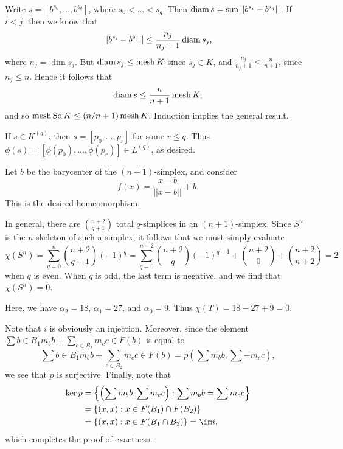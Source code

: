 \documentclass[../../solutions.tex]{subfiles}
\begin{document}
\begin{exercise} \leavevmode
Write $s=[b^{s_0},\dots,b^{s_q}]$, where $s_0<\dots<s_q$.
Then $\operatorname{diam} s=\sup||b^{s_i}-b^{s_j}||$.
If $i<j$, then we know that
\[||b^{s_i}-b^{s_j}||\le\frac{n_j}{n_j+1}\operatorname{diam} s_j,\]
where $n_j=\dim s_j$.
But $\operatorname{diam} s_j\le\operatorname{mesh} K$ since $s_j\in K$, and $\frac{n_j}{n_j+1}\le\frac{n}{n+1}$, since $n_j\le n$.
Hence it follows that
\[\operatorname{diam} s\le\frac n{n+1}\operatorname{mesh} K,\]
and so $\operatorname{mesh}\operatorname{Sd} K\le(n/n+1)\operatorname{mesh} K$.
Induction implies the general result.
\end{exercise}

\begin{exercise} \leavevmode
If $s\in K^{(q)}$, then $s=[p_0,\dots,p_r]$ for some $r\le q$.
Thus $\phi(s)=[\phi(p_0),\dots,\phi(p_r)]\in L^{(q)}$, as desired.
\end{exercise}

\begin{exercise} \leavevmode
Let $b$ be the barycenter of the $(n+1)$-simplex, and consider
\[f(x)=\frac{x-b}{||x-b||}+b.\]
This is the desired homeomorphism.
\end{exercise}

\begin{exercise} \leavevmode
In general, there are $\binom{n+2}{q+1}$ total $q$-simplices in an $(n+1)$-simplex.
Since $S^n$ is the $n$-skeleton of such a simplex, it follows that we must simply evaluate
\[\chi(S^n)=\sum_{q=0}^n\binom{n+2}{q+1}(-1)^q=\sum_{q=0}^{n+2}\binom{n+2}q(-1)^{q+1}+\binom{n+2}0+\binom{n+2}{n+2}=2\]
when $q$ is even.
When $q$ is odd, the last term is negative, and we find that $\chi(S^n)=0$.
\end{exercise}

\begin{exercise} \leavevmode
Here, we have $\alpha_2=18$, $\alpha_1=27$, and $\alpha_0=9$.
Thus $\chi(T)=18-27+9=0$.
\end{exercise}

\begin{exercise} \leavevmode
Note that $i$ is obviously an injection.
Moreover, since the element $\sum{b\in B_1}m_bb+\sum_{c\in B_2}m_cc\in F(b)$ is equal to
\[\sum{b\in B_1}m_bb+\sum_{c\in B_2}m_cc\in F(b)=p\left(\sum m_bb,\sum-m_cc\right),\]
we see that $p$ is surjective.
Finally, note that
\begin{align*}
\ker p&=\left\{\left(\sum m_bb,\sum m_cc\right):\sum m_bb=\sum m_cc\right\}\\
&=\{(x,x):x\in F(B_1)\cap F(B_2)\}\\
&=\{(x,x):x\in F(B_1\cap B_2)\}=\im i,
\end{align*}
which completes the proof of exactness.
\end{exercise}
\end{document}

